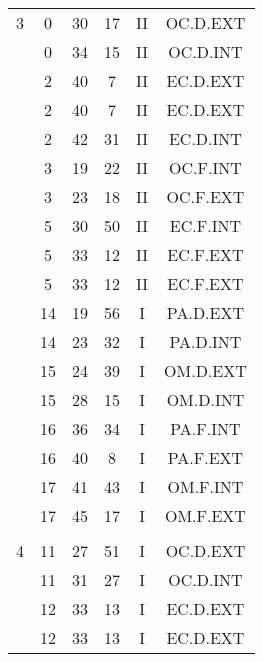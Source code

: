 \documentclass[12pt, a4paper]{article}
\begin{document}
\begin{multicols}{3}
{\begin{tabular}{c c c c c c}
	 	 	 	3 & 0 & 30 & 17 & II & OC.D.EXT\\%
	 	 	 	 & 0 & 34 & 15 & II & OC.D.INT\\%
	 	 	 	 & 2 & 40 & 7 & II & EC.D.EXT\\%
	 	 	 	 & 2 & 40 & 7 & II & EC.D.EXT\\%
	 	 	 	 & 2 & 42 & 31 & II & EC.D.INT\\%
	 	 	 	 & 3 & 19 & 22 & II & OC.F.INT\\%
	 	 	 	 & 3 & 23 & 18 & II & OC.F.EXT\\%
	 	 	 	 & 5 & 30 & 50 & II & EC.F.INT\\%
	 	 	 	 & 5 & 33 & 12 & II & EC.F.EXT\\%
	 	 	 	 & 5 & 33 & 12 & II & EC.F.EXT\\%
	 	 	 	 & 14 & 19 & 56 & I & PA.D.EXT\\%
	 	 	 	 & 14 & 23 & 32 & I & PA.D.INT\\%
	 	 	 	 & 15 & 24 & 39 & I & OM.D.EXT\\%
	 	 	 	 & 15 & 28 & 15 & I & OM.D.INT\\%
	 	 	 	 & 16 & 36 & 34 & I & PA.F.INT\\%
	 	 	 	 & 16 & 40 & 8 & I & PA.F.EXT\\%
	 	 	 	 & 17 & 41 & 43 & I & OM.F.INT\\%
	 	 	 	 & 17 & 45 & 17 & I & OM.F.EXT\\%
	 	 	 	 & & & & & \\%
	 	 	 	4 & 11 & 27 & 51 & I & OC.D.EXT\\%
	 	 	 	 & 11 & 31 & 27 & I & OC.D.INT\\%
	 	 	 	 & 12 & 33 & 13 & I & EC.D.EXT\\%
	 	 	 	 & 12 & 33 & 13 & I & EC.D.EXT\\%

\end{tabular}}
\end{multicols}
\end{document}
